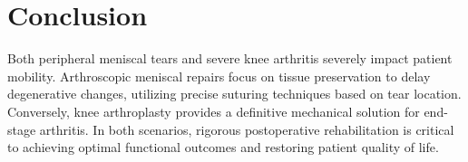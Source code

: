 \documentclass[12pt,a4paper]{article}
\begin{document}
\section{Conclusion}
Both peripheral meniscal tears and severe knee arthritis severely impact patient mobility. Arthroscopic meniscal repairs focus on tissue preservation to delay degenerative changes, utilizing precise suturing techniques based on tear location. Conversely, knee arthroplasty provides a definitive mechanical solution for end-stage arthritis. In both scenarios, rigorous postoperative rehabilitation is critical to achieving optimal functional outcomes and restoring patient quality of life.
\end{document}
